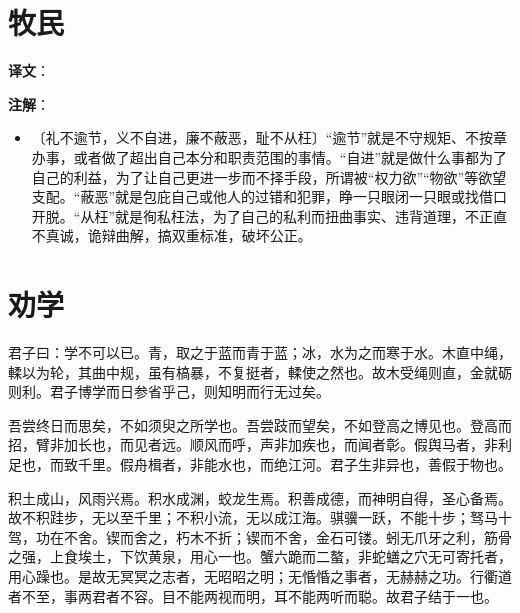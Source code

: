 \documentclass[12pt,UTF-8,openany]{ctexbook}
\begin{document}
\chapter{牧民}

\begin{normalsize}
    
    
\end{normalsize}


\newpage

\textbf{译文}：

\vspace{1em}

\begin{normalsize}
    
    
    
\end{normalsize}


\newpage

\textbf{注解}：

\vspace{-1em}

\begin{itemize}
    \setlength\itemsep{-0.2em}
    \item〔礼不逾节，义不自进，廉不蔽恶，耻不从枉〕“逾节”就是不守规矩、不按章办事，或者做了超出自己本分和职责范围的事情。“自进”就是做什么事都为了自己的利益，为了让自己更进一步而不择手段，所谓被“权力欲”“物欲”等欲望支配。“蔽恶”就是包庇自己或他人的过错和犯罪，睁一只眼闭一只眼或找借口开脱。“从枉”就是徇私枉法，为了自己的私利而扭曲事实、违背道理，不正直不真诚，诡辩曲解，搞双重标准，破坏公正。
\end{itemize}

\chapter{劝学}

\begin{normalsize}
    
    君子曰：学不可以已。青，取之于蓝而青于蓝；冰，水为之而寒于水。木直中绳，輮以为轮，其曲中规，虽有槁暴，不复挺者，輮使之然也。故木受绳则直，金就砺则利。君子博学而日参省乎己，则知明而行无过矣。
    
    吾尝终日而思矣，不如须臾之所学也。吾尝跂而望矣，不如登高之博见也。登高而招，臂非加长也，而见者远。顺风而呼，声非加疾也，而闻者彰。假舆马者，非利足也，而致千里。假舟楫者，非能水也，而绝江河。君子生非异也，善假于物也。
    
    积土成山，风雨兴焉。积水成渊，蛟龙生焉。积善成德，而神明自得，圣心备焉。故不积跬步，无以至千里；不积小流，无以成江海。骐骥一跃，不能十步；驽马十驾，功在不舍。锲而舍之，朽木不折；锲而不舍，金石可镂。蚓无爪牙之利，筋骨之强，上食埃土，下饮黄泉，用心一也。蟹六跪而二螯，非蛇蟮之穴无可寄托者，用心躁也。是故无冥冥之志者，无昭昭之明；无惛惛之事者，无赫赫之功。行衢道者不至，事两君者不容。目不能两视而明，耳不能两听而聪。故君子结于一也。
\end{normalsize}
\end{document}
